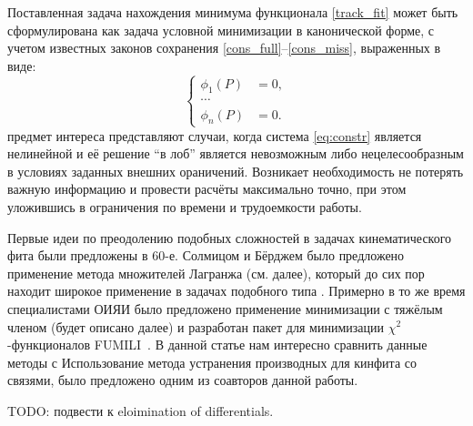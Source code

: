 %

Поставленная задача нахождения минимума функционала \eqref{track_fit} может быть сформулирована как задача условной минимизации в канонической форме, с учетом известных законов сохранения \eqref{cons_full}--\eqref{cons_miss}, выраженных в виде:
\begin{equation}
\label{eq:constr}
\left\{
\begin{aligned}
\phi_1(P) &= 0,\\
\cdots\\
\phi_n(P) &= 0.
\end{aligned}
\right.
\end{equation}
предмет интереса представляют случаи, когда система \eqref{eq:constr} является нелинейной и её решение ``в лоб'' является невозможным либо нецелесообразным в условиях заданных внешних ораничений.
Возникает необходимость не потерять важную информацию и провести расчёты максимально точно, при этом уложившись в ограничения по времени и трудоемкости работы.

Первые идеи по преодолению подобных сложностей в задачах кинематического фита были предложены в 60-е. Солмицом и Бёрджем \cite{b1} было предложено применение метода множителей Лагранжа (см. далее), который до сих пор находит широкое применение в задачах подобного типа \cite{b4}. %
Примерно в то же время специалистами ОИЯИ было предложено применение минимизации с тяжёлым членом \cite{b5} (будет описано далее) и разработан пакет для минимизации $\chi^2$-функционалов FUMILI~\cite{fum_1st}.
В данной статье нам интересно сравнить данные методы с 
Использование метода устранения производных для кинфита со связями, было предложено одним из соавторов данной работы.

TODO: подвести к eloimination of differentials.
